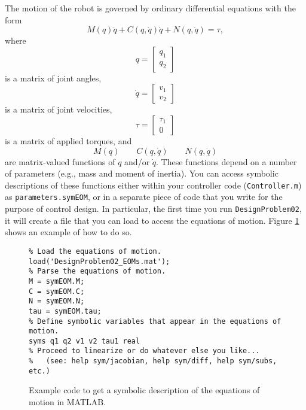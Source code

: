 \documentclass[12pt]{article}
\begin{document}
The motion of the robot is governed by ordinary differential equations with the form
\begin{equation}
\label{eqEOM}
M(q) \ddot{q} + C(q,\dot{q})\dot{q} + N(q,\dot{q}) = \tau,
\end{equation}
where
\begin{equation*}
q = \begin{bmatrix} q_{1} \\ q_{2} \end{bmatrix}
\end{equation*}
is a matrix of joint angles,
\begin{equation*}
\dot{q} = \begin{bmatrix} v_{1} \\ v_{2} \end{bmatrix}
\end{equation*}
is a matrix of joint velocities,
\begin{equation*}
\tau = \begin{bmatrix} \tau_{1} \\ 0 \end{bmatrix}
\end{equation*}
is a matrix of applied torques, and
\begin{equation*}
M(q) \qquad C(q,\dot{q}) \qquad N(q,\dot{q})
\end{equation*}
are matrix-valued functions of $q$ and/or $\dot{q}$. These functions depend on a number of parameters (e.g., mass and moment of inertia). You can access symbolic descriptions of these functions either within your controller code (\lstinline|Controller.m|) as \lstinline|parameters.symEOM|, or in a separate piece of code that you write for the purpose of control design. In particular, the first time you run \lstinline|DesignProblem02|, it will create a file that you can load to access the equations of motion. Figure \ref{figCodeEOM} shows an example of how to do so.
\begin{figure}
\begin{lstlisting}
% Load the equations of motion.
load('DesignProblem02_EOMs.mat');
% Parse the equations of motion.
M = symEOM.M;
C = symEOM.C;
N = symEOM.N;
tau = symEOM.tau;
% Define symbolic variables that appear in the equations of motion.
syms q1 q2 v1 v2 tau1 real
% Proceed to linearize or do whatever else you like...
%	(see: help sym/jacobian, help sym/diff, help sym/subs, etc.)
\end{lstlisting}
\caption{Example code to get a symbolic description of the equations of motion in MATLAB. \label{figCodeEOM}}
\end{figure}
\end{document}
